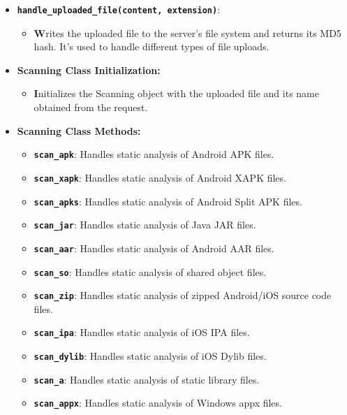 \documentclass{report}
\begin{document}
\begin{itemize}
\begin{itemize}
\begin{itemize}
          \item \textbf \texttt{handle\_uploaded\_file(content, extension)}:
          \begin{itemize}
            \item \textbf Writes the uploaded file to the server's file system and returns its MD5 hash. It's used to handle different types of file uploads.
          \end{itemize}
          
          \item \textbf{Scanning Class Initialization:}
          \begin{itemize}
            \item \textbf Initializes the Scanning object with the uploaded file and its name obtained from the request.
          \end{itemize}
          
          \item \textbf{Scanning Class Methods:}
          \begin{itemize}
            \item \textbf \texttt{scan\_apk}: Handles static analysis of Android APK files.
            \item \textbf \texttt{scan\_xapk}: Handles static analysis of Android XAPK files.
            \item \textbf \texttt{scan\_apks}: Handles static analysis of Android Split APK files.
            \item \textbf \texttt{scan\_jar}: Handles static analysis of Java JAR files.
            \item \textbf \texttt{scan\_aar}: Handles static analysis of Android AAR files.
            \item \textbf \texttt{scan\_so}: Handles static analysis of shared object files.
            \item \textbf \texttt{scan\_zip}: Handles static analysis of zipped Android/iOS source code files.
            \item \textbf \texttt{scan\_ipa}: Handles static analysis of iOS IPA files.
            \item \textbf \texttt{scan\_dylib}: Handles static analysis of iOS Dylib files.
            \item \textbf \texttt{scan\_a}: Handles static analysis of static library files.
            \item \textbf \texttt{scan\_appx}: Handles static analysis of Windows appx files.
          \end{itemize}
        \end{itemize}


\end{itemize}
\end{itemize}
\end{document}
